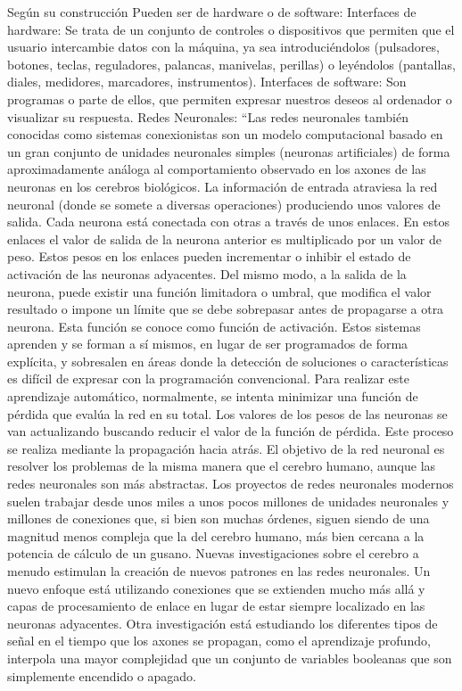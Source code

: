     Según su construcción Pueden ser de hardware o de software:
    Interfaces de hardware: Se trata de un conjunto de controles o dispositivos que permiten que el usuario intercambie datos con la máquina, ya sea introduciéndolos (pulsadores, botones, teclas, reguladores, palancas, manivelas, perillas) o leyéndolos (pantallas, diales, medidores, marcadores, instrumentos).
    Interfaces de software: Son programas o parte de ellos, que permiten expresar nuestros deseos al ordenador o visualizar su respuesta.
    Redes Neuronales: “Las redes neuronales también conocidas como sistemas conexionistas son un modelo computacional basado en un gran conjunto de unidades neuronales simples (neuronas artificiales) de forma aproximadamente análoga al comportamiento observado en los axones de las neuronas en los cerebros biológicos. La información de entrada atraviesa la red neuronal (donde se somete a diversas operaciones) produciendo unos valores de salida.
    Cada neurona está conectada con otras a través de unos enlaces. En estos enlaces el valor de salida de la neurona anterior es multiplicado por un valor de peso. Estos pesos en los enlaces pueden incrementar o inhibir el estado de activación de las neuronas adyacentes. Del mismo modo, a la salida de la neurona, puede existir una función limitadora o umbral, que modifica el valor resultado o impone un límite que se debe sobrepasar antes de propagarse a otra neurona. Esta función se conoce como función de activación.
    Estos sistemas aprenden y se forman a sí mismos, en lugar de ser programados de forma explícita, y sobresalen en áreas donde la detección de soluciones o características es difícil de expresar con la programación convencional. Para realizar este aprendizaje automático, normalmente, se intenta minimizar una función de pérdida que evalúa la red en su total. Los valores de los pesos de las neuronas se van actualizando buscando reducir el valor de la función de pérdida. Este proceso se realiza mediante la propagación hacia atrás.
    El objetivo de la red neuronal es resolver los problemas de la misma manera que el cerebro humano, aunque las redes neuronales son más abstractas. Los proyectos de redes neuronales modernos suelen trabajar desde unos miles a unos pocos millones de unidades neuronales y millones de conexiones que, si bien son muchas órdenes, siguen siendo de una magnitud menos compleja que la del cerebro humano, más bien cercana a la potencia de cálculo de un gusano.
    Nuevas investigaciones sobre el cerebro a menudo estimulan la creación de nuevos patrones en las redes neuronales. Un nuevo enfoque está utilizando conexiones que se extienden mucho más allá y capas de procesamiento de enlace en lugar de estar siempre localizado en las neuronas adyacentes. Otra investigación está estudiando los diferentes tipos de señal en el tiempo que los axones se propagan, como el aprendizaje profundo, interpola una mayor complejidad que un conjunto de variables booleanas que son simplemente encendido o apagado.
